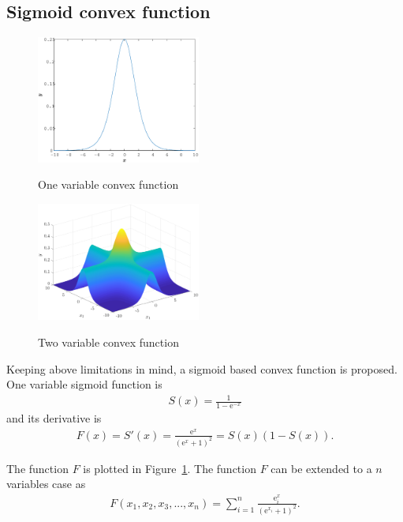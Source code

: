 \documentclass[twocolumn]{svjour3}          %
\newcommand{\me}{\mathrm{e}}
\begin{document}
\subsection{Sigmoid convex function}
\begin{figure}
	\centering
	\includegraphics[width=0.48\textwidth]{images/1FactorsSigmoid}
	\label{Fig:OneVarSigmoid}
	\caption{One variable convex function}
\end{figure}
\begin{figure}
	\centering
	\includegraphics[width=0.48\textwidth]{images/2FactorsSigmoid}
	\label{Fig:MultiVarSigmoid}
	\caption{Two variable convex function}
\end{figure}
Keeping above limitations in mind, a sigmoid based convex function is proposed. One variable sigmoid function is
\begin{eqnarray}
S(x) = \frac{1}{1-\me^{-x}} \label{Eqn:Sigmoid}
\end{eqnarray}
and its derivative is
\begin{eqnarray}
F(x) = S'(x) = \frac{\me^x}{(\me^{x}+1)^2} = S(x)(1-S(x)). \label{Eqn:DiffSigmoid}
\end{eqnarray}
\par
The function $F$ is plotted in Figure~\ref{Fig:OneVarSigmoid}. The function $F$ can be extended to a $n$ variables case as
\begin{eqnarray}
F(x_1, x_2, x_3, ..., x_n) = \sum_{i=1}^{n}{\frac{\me^x_i}{(\me^{x_i}+1)^2}}. \label{Eqn:DiffSigmoidMulti}
\end{eqnarray}
\par
\end{document}

